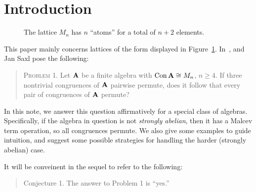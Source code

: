 \section{Introduction}
\begin{figure}[!h]
  \caption{The lattice $M_n$ has $n$ ``atoms'' for a total of $n+2$ elements.}
  \label{fig:Mn}
\end{figure}
This paper mainly concerns lattices of the form displayed in Figure~\ref{fig:Mn}.
In~\cite{PalfySaxl}, \Peter \Palfy and Jan Saxl pose 
the following: 
\begin{quote}
  {\scshape Problem 1.}
  Let $\mathbf{A}$ be a finite algebra with $\operatorname{Con} \mathbf{A} \cong M_n$, $n\geq
  4$. If three nontrivial congruences of $\mathbf{A}$ pairwise permute, does it follow
  that every pair of congruences of $\mathbf{A}$ permute?
\end{quote}
In this note, we answer this question affirmatively for a special class of
algebras. 
Specifically, if the algebra in question is not \emph{strongly abelian}, then it has a 
Malcev term operation, so all congruences permute.  
We also give some examples to guide intuition, and suggest some 
possible strategies for handling the harder (strongly abelian) case. 

It will be conveinent in the sequel to refer to the following:
\begin{quote}
  {\sc Conjecture 1.} The answer to Problem 1 is ``yes.''
\end{quote}


